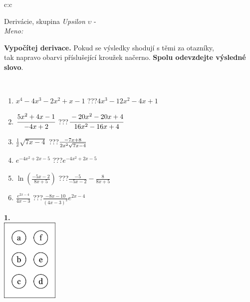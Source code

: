 \documentclass[10pt]{report}
\begin{document}
\begin{tabular}{c:c}
\begin{minipage}[c][104.5mm][t]{0.5\linewidth}
\begin{center}
\vspace{7mm}
{\huge Derivácie, skupina \textit{Upsilon $\upsilon$} -}\\[5mm]
\textit{Meno:}\phantom{xxxxxxxxxxxxxxxxxxxxxxxxxxxxxxxxxxxxxxxxxxxxxxxxxxxxxxxxxxxxxxxxx}\\[5mm]
\begin{minipage}{0.95\linewidth}
\begin{center}
\textbf{Vypočítej derivace.} Pokud se výsledky shodují s těmi za otazníky,\\tak napravo obarvi příslušející kroužek načerno. \textbf{Spolu odevzdejte výsledné slovo}.
\end{center}
\end{minipage}
\\[1mm]
\begin{minipage}{0.79\linewidth}
\begin{center}
\begin{varwidth}{\linewidth}
\begin{enumerate}
\normalsize
\item $x^4-4x^3-2x^2+x-1$\quad \dotfill\; ???\;\dotfill \quad $4x^3-12x^2-4x+1$
\item $\cfrac{5x^2+4x-1}{-4x+2}$\quad \dotfill\; ???\;\dotfill \quad $\cfrac{-20x^2-20x+4}{16x^2-16x+4}$
\item $\frac{1}{x}\sqrt{7x-4}$\quad \dotfill\; ???\;\dotfill \quad $\frac{-7x+8}{2x^2 \sqrt{\smash[b]{7x-4}}}$
\item $e^{-4x^2+2x-5}$\quad \dotfill\; ???\;\dotfill \quad $e^{-4x^2+2x-5}$
\item $\ln{\left(\frac{-5x-2}{8x+5}\right)}$\quad \dotfill\; ???\;\dotfill \quad $\frac{-5}{-5x-2}-\frac{8}{8x+5}$
\item $\frac{e^{2x-4}}{4x-3}$\quad \dotfill\; ???\;\dotfill \quad $\frac{-8x-10}{(4x-3)^2}e^{2x-4}$
\end{enumerate}
\end{varwidth}
\end{center}
\end{minipage}
\begin{minipage}{0.20\linewidth}
\begin{center}
{\Huge\bfseries 1.} \\[2mm]
\includegraphics[height=40mm]{../images/braille.png}

\end{center}
\end{minipage}
\end{center}
\end{minipage}
\end{tabular}
\end{document}
